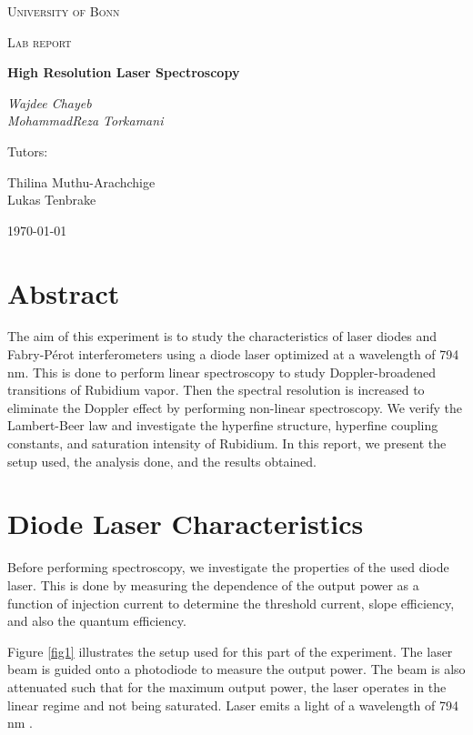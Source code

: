 \documentclass[12pt]{article}
\begin{document}
\begin{titlepage}
	\centering
	{\textsc{University of Bonn} \par}
	\vspace{1cm}
	{\Large \textsc{Lab report}\par}
	\vspace{1.5cm}
	{\huge\bfseries High Resolution Laser Spectroscopy\par}
	\vspace{2cm}
	{\Large\itshape Wajdee Chayeb \\
	MohammadReza Torkamani\par}
	\vfill
	Tutors:\par
	Thilina Muthu-Arachchige\\
	Lukas Tenbrake

	\vfill

	{\large \today\par}
\end{titlepage}

\tableofcontents


\section{Abstract}
The aim of this experiment is to study the characteristics of laser diodes and Fabry-Pérot interferometers using a diode laser optimized at a wavelength of 794 nm. This is done to perform linear spectroscopy to study Doppler-broadened transitions of Rubidium vapor. Then the spectral resolution is increased to eliminate the Doppler effect by performing non-linear spectroscopy. We verify the Lambert-Beer law and investigate the hyperfine structure, hyperfine coupling constants, and saturation intensity of Rubidium. In this report, we present the setup used, the analysis done, and the results obtained.

\section{Diode Laser Characteristics} 
Before performing spectroscopy, we investigate the properties of the used diode laser. This is done by measuring the dependence of the output power as a function of injection current to determine the threshold current, slope efficiency, and also the quantum efficiency. 

Figure \ref{fig1} illustrates the setup used for this part of the experiment. The laser beam is guided onto a photodiode to measure the output power. The beam is also attenuated such that for the maximum output power, the laser operates in the linear regime and not being saturated.  Laser emits a light of a wavelength of 794 nm \cite{lecturenote}.
\end{document}
